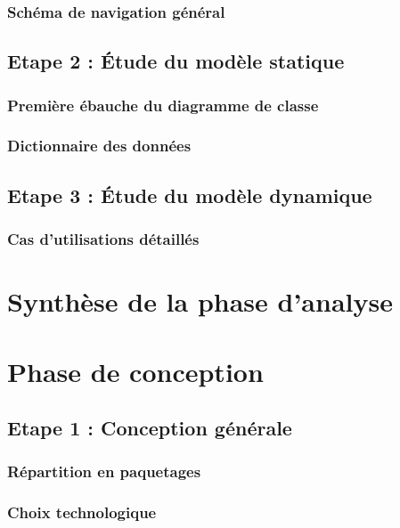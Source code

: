 \documentclass[a4paper,table]{article}
\begin{document}
\subsubsection{Schéma de navigation général}

\subsection{Etape 2 : Étude du modèle statique}

\subsubsection{Première ébauche du diagramme de classe}

\subsubsection{Dictionnaire des données}

\subsection{Etape 3 : Étude du modèle dynamique}

\subsubsection{Cas d'utilisations détaillés}

\newpage

\section{Synthèse de la phase d'analyse}

\newpage

\section{Phase de conception}

\subsection{Etape 1 : Conception générale}

\subsubsection{Répartition en paquetages}

\subsubsection{Choix technologique}
\end{document}

